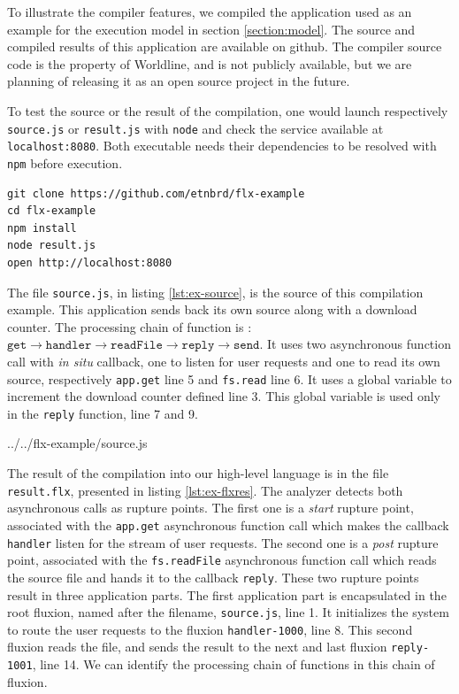 To illustrate the compiler features, we compiled the application used as an example for the execution model in section \ref{section:model}.
The source and compiled results of this application are available on github\cite{flx-example}.
The compiler source code is the property of Worldline, and is not publicly available, but we are planning of releasing it as an open source project in the future.

To test the source or the result of the compilation, one would launch respectively \texttt{source.js} or \texttt{result.js} with \texttt{node} and check the service available at \texttt{localhost:8080}.
Both executable needs their dependencies to be resolved with \texttt{npm} before execution.
\begin{verbatim}
git clone https://github.com/etnbrd/flx-example
cd flx-example
npm install
node result.js
open http://localhost:8080
\end{verbatim}

The file \texttt{source.js}, in listing \ref{lst:ex-source}, is the source of this compilation example.
This application sends back its own source along with a download counter.
The processing chain of function is : $\texttt{get} \to \texttt{handler} \to \texttt{readFile} \to \texttt{reply} \to \texttt{send}$.
It uses two asynchronous function call with \textit{in situ} callback, one to listen for user requests and one to read its own source, respectively \texttt{app.get} line 5 and \texttt{fs.read} line 6.
It uses a global variable to increment the download counter defined line 3.
This global variable is used only in the \texttt{reply} function, line 7 and 9.

{../../flx-example/source.js}

The result of the compilation into our high-level language is in the file \texttt{result.flx}, presented in listing \ref{lst:ex-flxres}.
The analyzer detects both asynchronous calls as rupture points.
The first one is a \textit{start} rupture point, associated with the \texttt{app.get} asynchronous function call which makes the callback \texttt{handler} listen for the stream of user requests. 
The second one is a \textit{post} rupture point, associated with the \texttt{fs.readFile} asynchronous function call which reads the source file and hands it to the callback \texttt{reply}.
These two rupture points result in three application parts.
The first application part is encapsulated in the root fluxion, named after the filename, \texttt{source.js}, line 1.
It initializes the system to route the user requests to the fluxion \texttt{handler-1000}, line 8.
This second fluxion reads the file, and sends the result to the next and last fluxion \texttt{reply-1001}, line 14.
We can identify the processing chain of functions in this chain of fluxion.

